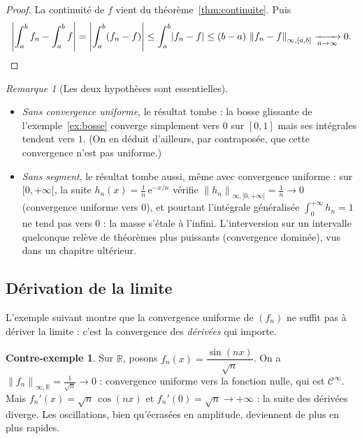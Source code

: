 \documentclass[11pt,a4paper]{article}
\theoremstyle{plain}
\theoremstyle{definition}
\newtheorem{contrex}[theoreme]{Contre-exemple}
\theoremstyle{remark}
\newtheorem{remarque}[theoreme]{Remarque}
\newcommand{\R}{\mathbb{R}}
\newcommand{\Ninf}[2]{\left\lVert #1 \right\rVert_{\infty,#2}}
\numberwithin{equation}{section}
\begin{document}
\begin{proof}
La continuité de $f$ vient du théorème~\ref{thm:continuite}. Puis
\[
    \left\lvert \int_a^b f_n - \int_a^b f \right\rvert
    = \left\lvert \int_a^b (f_n-f) \right\rvert
    \leq \int_a^b \lvert f_n-f\rvert
    \leq (b-a)\,\Ninf{f_n-f}{[a,b]} \xrightarrow[n\to\infty]{} 0 . \qedhere
\]
\end{proof}

\begin{remarque}[Les deux hypothèses sont essentielles]\label{rem:hyp-integration}
\begin{itemize}
    \item \emph{Sans convergence uniforme}, le résultat tombe : la bosse
    glissante de l'exemple~\ref{ex:bosse} converge simplement vers $0$ sur
    $[0,1]$ mais ses intégrales tendent vers $1$. (On en déduit d'ailleurs,
    par contraposée, que cette convergence n'est pas uniforme.)
    \item \emph{Sans segment}, le résultat tombe aussi, même avec
    convergence uniforme : sur $[0,+\infty[$, la suite
    $h_n(x)=\frac1n\,\mathrm{e}^{-x/n}$ vérifie $\Ninf{h_n}{[0,+\infty[}
    = \frac1n \to 0$ (convergence uniforme vers $0$), et pourtant
    l'intégrale généralisée $\int_0^{+\infty} h_n = 1$ ne tend pas vers
    $0$ : la masse \og s'étale \fg{} à l'infini. L'interversion sur un
    intervalle quelconque relève de théorèmes plus puissants (convergence
    dominée), vus dans un chapitre ultérieur.
\end{itemize}
\end{remarque}

\subsection{Dérivation de la limite}

L'exemple suivant montre que la convergence uniforme de $(f_n)$ ne suffit
pas à dériver la limite : c'est la convergence des \emph{dérivées} qui
importe.

\begin{contrex}\label{cex:derivation}
Sur $\R$, posons $f_n(x)=\dfrac{\sin(nx)}{\sqrt{n}}$. On a
$\Ninf{f_n}{\R}=\frac{1}{\sqrt n}\to 0$ : convergence uniforme vers la
fonction nulle, qui est $\mathcal{C}^\infty$. Mais
$f_n'(x)=\sqrt{n}\,\cos(nx)$ et $f_n'(0)=\sqrt n \to +\infty$ : la suite
des dérivées diverge. Les oscillations, bien qu'écrasées en amplitude,
deviennent de plus en plus rapides.
\end{contrex}
\end{document}
